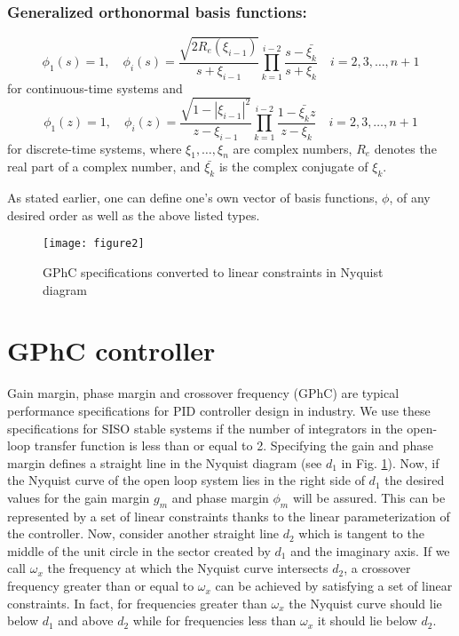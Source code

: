\documentclass [12pt , a4paper] {report}
\begin{document}
\subsubsection{Generalized orthonormal basis functions:}

\begin{equation}
\phi_1(s)=1, \quad \phi_i(s)=\frac{\sqrt{2R_e(\xi_{i-1})}}{s+\xi_{i-1}} \prod_{k=1}^{i-2}\frac{s-\bar{\xi_k}}{s+\xi_k} \quad  i=2,3,\ldots,n+1 
\end{equation}
for continuous-time systems and
\begin{equation}
\phi_1(z)=1, \quad \phi_i(z)=\frac{\sqrt{1-|\xi_{i-1}|^2}}{z-\xi_{i-1}} \prod_{k=1}^{i-2}\frac{1-\bar{\xi_k}z}{z-\xi_k} \quad  i=2,3,\ldots,n+1 
\end{equation}
for discrete-time systems,
where $\xi_1, \ldots, \xi_n$ are complex numbers, $R_e$ denotes the real part of a complex number, and $\bar{\xi_k}$ is the complex conjugate of $\xi_k$.

As stated earlier, one can define one's own vector of basis functions, $\phi$, of any desired order as well as the above listed types.

\begin{figure}
\centering
{}
\texttt{[image: figure2]}
\caption{GPhC specifications converted to linear constraints in Nyquist diagram}
\label{fig:GPhC}
\end{figure}

\section{GPhC controller}
Gain margin, phase margin and crossover frequency (GPhC) are typical performance specifications for PID controller design in industry. We use these specifications for SISO stable systems if the number of integrators in the open-loop transfer function is less than or equal to 2. Specifying the gain and phase margin defines a straight line in the Nyquist diagram (see $d_1$ in Fig. \ref{fig:GPhC}). Now, if the Nyquist curve of the open loop system lies in the right side of $d_1$ the desired values for the gain margin $g_m$ and phase margin $\phi_m$ will be assured. This can be represented by a set of linear constraints thanks to the linear parameterization of the controller. Now, consider another straight line $d_2$ which is tangent to the middle of the unit circle in the sector created by $d_1$ and the imaginary axis. If we call $\omega_x$ the frequency at which the Nyquist curve intersects $d_2$, a crossover frequency greater than or equal to $\omega_x$ can be achieved by satisfying a set of linear constraints. In fact, for frequencies greater than $\omega_x$ the Nyquist curve should lie below $d_1$ and above $d_2$ while for frequencies less than $\omega_x$ it should lie below $d_2$.
\end{document}
